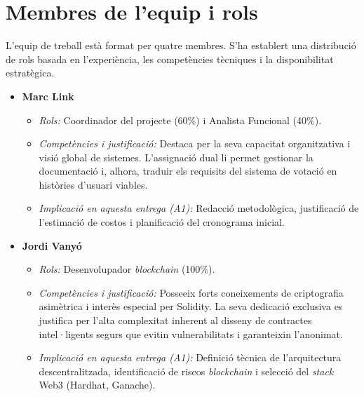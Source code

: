 \documentclass[12pt,a4paper]{article}
\begin{document}
\section{Membres de l'equip i rols}

L'equip de treball està format per quatre membres. S'ha establert una distribució de rols basada en l'experiència, les competències tècniques i la disponibilitat estratègica.

\begin{itemize}[leftmargin=*]
    \item \textbf{Marc Link} 
    \begin{itemize}
        \item \textit{Rols:} Coordinador del projecte (60\%) i Analista Funcional (40\%).
        \item \textit{Competències i justificació:} Destaca per la seva capacitat organitzativa i visió global de sistemes. L'assignació dual li permet gestionar la documentació i, alhora, traduir els requisits del sistema de votació en històries d'usuari viables.
        \item \textit{Implicació en aquesta entrega (A1):} Redacció metodològica, justificació de l'estimació de costos i planificació del cronograma inicial.
    \end{itemize}

    \item \textbf{Jordi Vanyó} 
    \begin{itemize}
        \item \textit{Rols:} Desenvolupador \textit{blockchain} (100\%).
        \item \textit{Competències i justificació:} Posseeix forts coneixements de criptografia asimètrica i interès especial per Solidity. La seva dedicació exclusiva es justifica per l'alta complexitat inherent al disseny de contractes intel·ligents segurs que evitin vulnerabilitats i garanteixin l'anonimat.
        \item \textit{Implicació en aquesta entrega (A1):} Definició tècnica de l'arquitectura descentralitzada, identificació de riscos \textit{blockchain}  i selecció del \textit{stack} Web3 (Hardhat, Ganache).
    \end{itemize}


\end{itemize}
\end{document}
